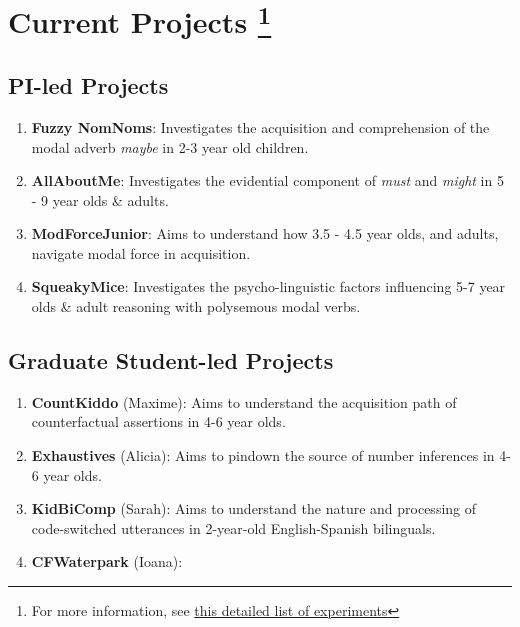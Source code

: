\documentclass[
]{book}
\providecommand{\tightlist}{%
  \setlength{\itemsep}{0pt}\setlength{\parskip}{0pt}}
\begin{document}
\hypertarget{current-projects}{%
\section[Current Projects ]{\texorpdfstring{Current Projects \footnote{For more information, see \protect\hyperlink{expov}{this detailed list of experiments}}}{Current Projects }}\label{current-projects}}

\hypertarget{pi-led-projects}{%
\subsection*{PI-led Projects}\label{pi-led-projects}}

\begin{enumerate}
\def\labelenumi{\arabic{enumi}.}
\tightlist
\item
  \textbf{Fuzzy NomNoms}: Investigates the acquisition and comprehension of the modal adverb \emph{maybe} in 2-3 year old children.
\item
  \textbf{AllAboutMe}: Investigates the evidential component of \emph{must} and \emph{might} in 5 - 9 year olds \& adults.
\item
  \textbf{ModForceJunior}: Aims to understand how 3.5 - 4.5 year olds, and adults, navigate modal force in acquisition.
\item
  \textbf{SqueakyMice}: Investigates the psycho-linguistic factors influencing 5-7 year olds \& adult reasoning with polysemous modal verbs.
\end{enumerate}

\hypertarget{graduate-student-led-projects}{%
\subsection*{Graduate Student-led Projects}\label{graduate-student-led-projects}}

\begin{enumerate}
\def\labelenumi{\arabic{enumi}.}
\tightlist
\item
  \textbf{CountKiddo} (Maxime): Aims to understand the acquisition path of counterfactual assertions in 4-6 year olds.
\item
  \textbf{Exhaustives} (Alicia): Aims to pindown the source of number inferences in 4-6 year olds.
\item
  \textbf{KidBiComp} (Sarah): Aims to understand the nature and processing of code-switched utterances in 2-year-old English-Spanish bilinguals.
\item
  \textbf{CFWaterpark} (Ioana):
\end{enumerate}
\end{document}
